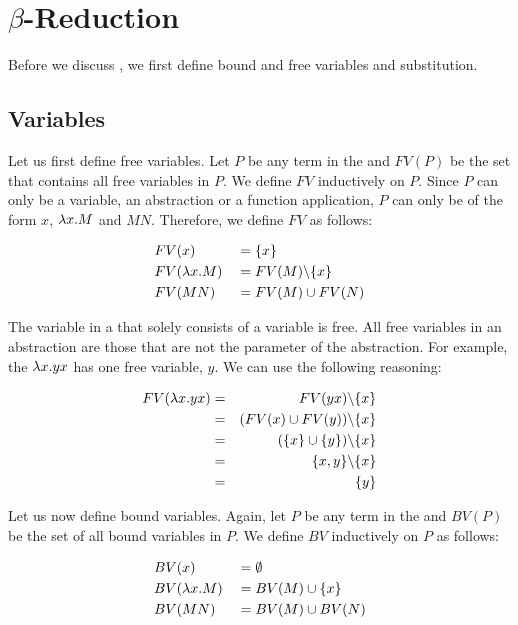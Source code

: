 \section{\texorpdfstring{\boldmath${\beta}$-Reduction}{Beta Reduction}}
Before we discuss \br, we first define bound and free variables and substitution.

\subsection{Variables}
Let us first define free variables. 
Let $P$ be any term in the \lc and $FV(P)$ be the set that contains all free variables in $P$. We define $FV$ inductively on $P$.
Since $P$ can only be a variable, an abstraction or a function application, $P$ can only be of the form $x$, $\lambda {x}.{M}$ and $M N$.
Therefore, we define $FV$ as follows:

\[
\begin{aligned}
	& FV(x)           & &= \{x\} \\
	& FV(\lambda {x}.{M}) & &= FV(M) \backslash \{x\} \\
	& FV(M N)         & &= FV(M) \cup FV(N)
\end{aligned}
\]

The variable in a \lterm that solely consists of a variable is free. All free variables in an abstraction are those that are not the parameter of the abstraction.
For example, the \lterm $\lambda {x}.{yx}$ has one free variable, $y$. We can use the following reasoning:

\begin{eqnarray*}
	FV(\lambda {x}.{yx}) &=& FV(y x) \backslash \{x\} \\
	&=& (FV(x) \cup FV(y)) \backslash \{x\} \\
	&=& (\{x\} \cup \{y\}) \backslash \{x\} \\
	&=& \{x, y\} \backslash \{x\} \\
	&=& \{y\}
\end{eqnarray*}

Let us now define bound variables. Again, let $P$ be any term in the \lc and $BV(P)$ be the set of all bound variables in $P$. 
We define $BV$ inductively on $P$ as follows:

\[
\begin{aligned}
	& BV(x)           & &= \emptyset \\
	& BV(\lambda {x}.{M}) & &= BV(M) \cup \{x\} \\
	& BV(M N)         & &= BV(M) \cup BV(N)
\end{aligned}
\]

